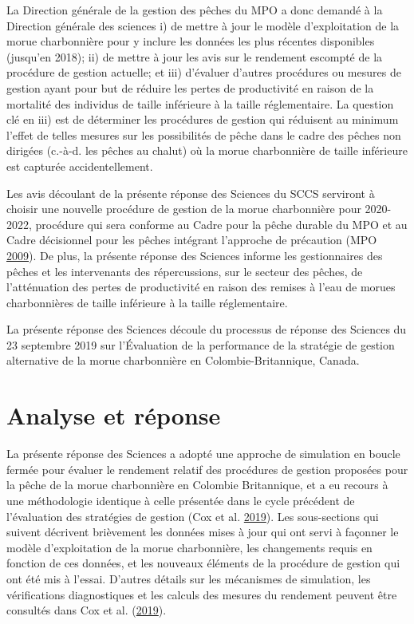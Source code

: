 \documentclass[11pt]{book}
\begin{document}
La Direction générale de la gestion des pêches du MPO a donc demandé à la Direction générale des sciences i) de mettre à jour le modèle d'exploitation de la morue charbonnière pour y inclure les données les plus récentes disponibles (jusqu'en 2018); ii) de mettre à jour les avis sur le rendement escompté de la procédure de gestion actuelle; et iii) d'évaluer d'autres procédures ou mesures de gestion ayant pour but de réduire les pertes de productivité en raison de la mortalité des individus de taille inférieure à la taille réglementaire. La question clé en iii) est de déterminer les procédures de gestion qui réduisent au minimum l'effet de telles mesures sur les possibilités de pêche dans le cadre des pêches non dirigées (c.-à-d. les pêches au chalut) où la morue charbonnière de taille inférieure est capturée accidentellement.

Les avis découlant de la présente réponse des Sciences du SCCS serviront à choisir une nouvelle procédure de gestion de la morue charbonnière pour 2020-2022, procédure qui sera conforme au Cadre pour la pêche durable du MPO et au Cadre décisionnel pour les pêches intégrant l'approche de précaution (MPO \protect\hyperlink{ref-DFO2009}{2009}). De plus, la présente réponse des Sciences informe les gestionnaires des pêches et les intervenants des répercussions, sur le secteur des pêches, de l'atténuation des pertes de productivité en raison des remises à l'eau de morues charbonnières de taille inférieure à la taille réglementaire.

La présente réponse des Sciences découle du processus de réponse des Sciences du 23 septembre 2019 sur l'Évaluation de la performance de la stratégie de gestion alternative de la morue charbonnière en Colombie-Britannique, Canada.

\hypertarget{analyse-et-ruxe9ponse}{%
\section{Analyse et réponse}\label{analyse-et-ruxe9ponse}}

La présente réponse des Sciences a adopté une approche de simulation en boucle fermée pour évaluer le rendement relatif des procédures de gestion proposées pour la pêche de la morue charbonnière en Colombie Britannique, et a eu recours à une méthodologie identique à celle présentée dans le cycle précédent de l'évaluation des stratégies de gestion (Cox et al. \protect\hyperlink{ref-cox2019evaluating}{2019}). Les sous-sections qui suivent décrivent brièvement les données mises à jour qui ont servi à façonner le modèle d'exploitation de la morue charbonnière, les changements requis en fonction de ces données, et les nouveaux éléments de la procédure de gestion qui ont été mis à l'essai. D'autres détails sur les mécanismes de simulation, les vérifications diagnostiques et les calculs des mesures du rendement peuvent être consultés dans Cox et al. (\protect\hyperlink{ref-cox2019evaluating}{2019}).
\end{document}

